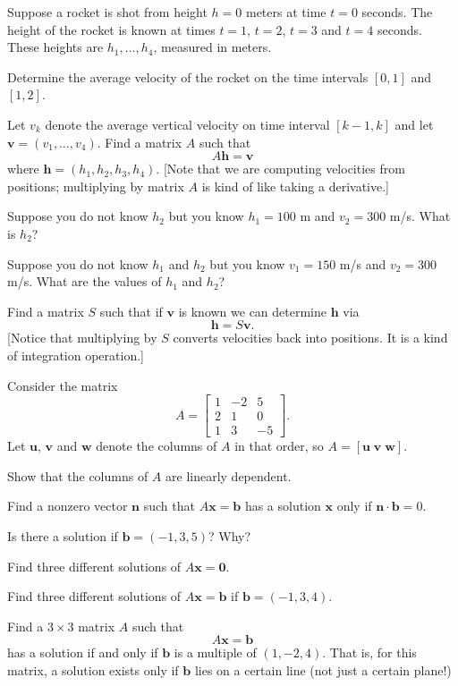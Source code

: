 \documentclass[minion]{homework}
\begin{document}
\begin{aproblems}
\aproblem  Suppose a rocket is shot from height $h=0$ meters
at time $t=0$ seconds.  The height of the rocket is known
at times $t=1$, $t=2$, $t=3$ and $t=4$ seconds. These 
heights are $h_1,\ldots,h_4$, measured in meters.
\begin{subproblems}
\item  Determine the average velocity of the rocket
on the time intervals $[0,1]$ and $[1,2]$.
\item Let $v_k$ denote the average vertical velocity on 
time interval $[k-1,k]$
and let $\mathbf v=(v_1,\ldots,v_4)$.
Find a matrix $A$ such that
\[
A\mathbf h = \mathbf v
\]
where $\mathbf h = (h_1,h_2,h_3,h_4)$.  [Note that
we are computing velocities from positions; multiplying by 
matrix $A$ is kind of like taking a derivative.]
\item Suppose you do not know $h_2$ but you know $h_1=100$ m and $v_2=300$ m/s.
What is $h_2$?
\item Suppose you do not know $h_1$ and $h_2$ but you know 
$v_1=150$ m/s and $v_2=300$ m/s.  What are the values of $h_1$ and $h_2$?
\item Find a matrix $S$ such that if $\mathbf v$ is known we can
determine $\mathbf h$ via
\[
\mathbf h = S\mathbf v.
\]
[Notice that multiplying by 
$S$ converts velocities back into positions.  It is a kind
of integration operation.]
\end{subproblems}

\aproblem
Consider the matrix
\[
A=\begin{bmatrix}   1 & -2&   5\\
   2&   1&   0\\
   1&   3&  -5
\end{bmatrix}.
\]
Let $\mathbf u$, $\mathbf v$ and $\mathbf w$ denote the
columns of $A$ in that order, so $A=[\mathbf u\; \mathbf v\; \mathbf w]$.
\begin{subproblems}
\item  Show that the columns of $A$ are linearly dependent.
\item  Find a nonzero vector $\mathbf n$ such that $A\mathbf x=\mathbf b$
has a solution $\mathbf x$ only if $\mathbf n\cdot \mathbf b=0$.
\item Is there a solution if $\mathbf b=(-1,3,5)$?  Why?
\item Find three different solutions of $A\mathbf x = \mathbf 0$.
\item Find three different solutions of $A\mathbf x = \mathbf b$
if $\mathbf b=(-1,3,4)$.
\end{subproblems}

\aproblem Find a $3\times 3$ matrix $A$ such that
\[
A\mathbf x = \mathbf b
\]
has a solution if and only if $\mathbf b$ is a multiple of $(1,-2,4)$.
That is, for this matrix, a solution exists only if $\mathbf b$ lies
on a certain line (not just a certain plane!)


\end{aproblems}
\end{document}
